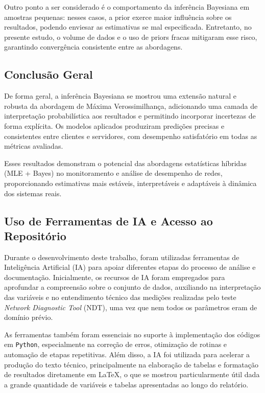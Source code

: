 \documentclass{article}
\begin{document}
Outro ponto a ser considerado é o comportamento da inferência Bayesiana em amostras pequenas:
nesses casos, a prior exerce maior influência sobre os resultados, podendo enviesar
as estimativas se mal especificada.  
Entretanto, no presente estudo, o volume de dados e o uso de priors fracas mitigaram esse risco,
garantindo convergência consistente entre as abordagens.

\subsection{Conclusão Geral}

De forma geral, a inferência Bayesiana se mostrou uma extensão natural e robusta
da abordagem de Máxima Verossimilhança, adicionando uma camada de interpretação probabilística
aos resultados e permitindo incorporar incertezas de forma explícita.
Os modelos aplicados produziram predições precisas e consistentes entre clientes e servidores,
com desempenho satisfatório em todas as métricas avaliadas.

Esses resultados demonstram o potencial das abordagens estatísticas híbridas
(MLE + Bayes) no monitoramento e análise de desempenho de redes,
proporcionando estimativas mais estáveis, interpretáveis e adaptáveis à dinâmica
dos sistemas reais.

\subsection{Uso de Ferramentas de IA e Acesso ao Repositório}

Durante o desenvolvimento deste trabalho, foram utilizadas ferramentas de Inteligência Artificial (IA) para apoiar diferentes etapas do processo de análise e documentação. Inicialmente, os recursos de IA foram empregados para aprofundar a compreensão sobre o conjunto de dados, auxiliando na interpretação das variáveis e no entendimento técnico das medições realizadas pelo teste \textit{Network Diagnostic Tool} (NDT), uma vez que nem todos os parâmetros eram de domínio prévio.

As ferramentas também foram essenciais no suporte à implementação dos códigos em \texttt{Python}, especialmente na correção de erros, otimização de rotinas e automação de etapas repetitivas. Além disso, a IA foi utilizada para acelerar a produção do texto técnico, principalmente na elaboração de tabelas e formatação de resultados diretamente em \LaTeX, o que se mostrou particularmente útil dada a grande quantidade de variáveis e tabelas apresentadas ao longo do relatório.
\end{document}
